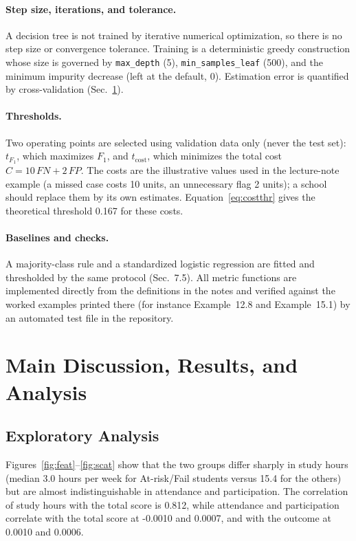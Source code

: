 \documentclass[12pt,a4paper]{article}
\theoremstyle{definition}
\begin{document}
\paragraph{Step size, iterations, and tolerance.} A decision tree is not trained by iterative numerical optimization, so there is no step size or convergence tolerance. Training is a deterministic greedy construction whose size is governed by \texttt{max\_depth} (5), \texttt{min\_samples\_leaf} (500), and the minimum impurity decrease (left at the default, $0$). Estimation error is quantified by cross-validation (Sec.~\ref{sec:results}).

\paragraph{Thresholds.} Two operating points are selected using validation data only (never the test set): $t_{F_1}$, which maximizes $F_1$, and $t_{\mathrm{cost}}$, which minimizes the total cost $C = 10\,FN + 2\,FP$. The costs are the illustrative values used in the lecture-note example (a missed case costs 10 units, an unnecessary flag 2 units); a school should replace them by its own estimates. Equation~\ref{eq:costthr} gives the theoretical threshold 0.167 for these costs.

\paragraph{Baselines and checks.} A majority-class rule and a standardized logistic regression are fitted and thresholded by the same protocol (Sec.~7.5). All metric functions are implemented directly from the definitions in the notes and verified against the worked examples printed there (for instance Example~12.8 and Example~15.1) by an automated test file in the repository.

\section{Main Discussion, Results, and Analysis}\label{sec:results}

\subsection{Exploratory Analysis}

Figures~\ref{fig:feat}--\ref{fig:scat} show that the two groups differ sharply in study hours (median 3.0 hours per week for At-risk/Fail students versus 15.4 for the others) but are almost indistinguishable in attendance and participation. The correlation of study hours with the total score is 0.812, while attendance and participation correlate with the total score at -0.0010 and 0.0007, and with the outcome at 0.0010 and 0.0006.
\end{document}
